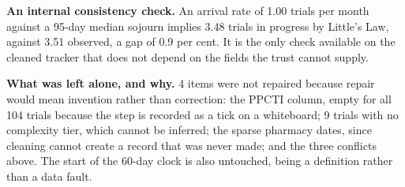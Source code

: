 \textbf{An internal consistency check.} An arrival rate of 1.00 trials per month against a 95-day median sojourn implies 3.48 trials in progress by Little's Law, against 3.51 observed, a gap of 0.9 per cent. It is the only check available on the cleaned tracker that does not depend on the fields the trust cannot supply.

\textbf{What was left alone, and why.} 4 items were not repaired because repair would mean invention rather than correction: the PPCTI column, empty for all 104 trials because the step is recorded as a tick on a whiteboard; 9 trials with no complexity tier, which cannot be inferred; the sparse pharmacy dates, since cleaning cannot create a record that was never made; and the three conflicts above. The start of the 60-day clock is also untouched, being a definition rather than a data fault.
